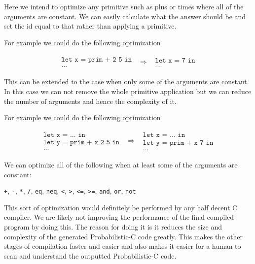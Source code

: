 \documentclass[a4paper]{article}
\newcommand{\optimization}[2]{
	\[
		\begin{array}{rcl}
			#1 & \Rightarrow & #2
		\end{array}
	\]
}
\begin{document}
Here we intend to optimize any primitive such as plus or times where all of the arguments are constant. We can easily calculate what the answer should be and set the id equal to that rather than applying a primitive.

For example we could do the following optimization
\optimization{
	\begin{array}{l}
		\texttt{let x = prim + 2 5 in} \\
		\texttt{...}
	\end{array}
}{
	\begin{array}{l}
		\texttt{let x = 7 in} \\
		\texttt{...}
	\end{array}
}
This can be extended to the case when only some of the arguments are constant. In this case we can not remove the whole primitive application but we can reduce the number of arguments and hence the complexity of it.

For example we could do the following optimization
\optimization{
	\begin{array}{l}
		\texttt{let x = ... in} \\
		\texttt{let y = prim + x 2 5 in} \\
		\texttt{...}
	\end{array}
}{
	\begin{array}{l}
		\texttt{let x = ... in} \\
		\texttt{let y = prim + x 7 in} \\
		\texttt{...}
	\end{array}
}
We can optimize all of the following when at least some of the arguments are constant:
\begin{center}
	\texttt{+}, \texttt{-}, \texttt{*}, \texttt{/}, \texttt{eq}, \texttt{neq}, \texttt{<}, \texttt{>}, \texttt{<=}, \texttt{>=}, \texttt{and}, \texttt{or}, \texttt{not}
\end{center}
This sort of optimization would definitely be performed by any half decent C compiler. We are likely not improving the performance of the final compiled program by doing this. The reason for doing it is it reduces the size and complexity of the generated Probabilistic-C code greatly. This makes the other stages of compilation faster and easier and also makes it easier for a human to scan and understand the outputted Probabilistic-C code.



\end{document}
